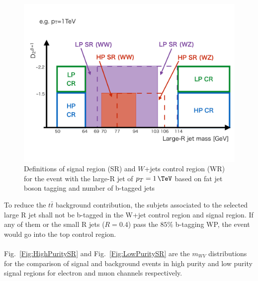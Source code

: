\begin{figure}[h]
	\centering
	\includegraphics[width=0.8\hsize]{Chapter3/HPLPdefinitions}
	\caption{Definitions of signal region (SR) and $W$+jets control region (WR) for the event with the large-R jet of $\pt=1\,\TeV$ based on fat jet boson tagging and number of b-tagged jets }
	\label{Fig:HPLPdefinitions}
\end{figure}
\noindent
To reduce the $t\bar{t}$ background contribution, the subjets associated to the selected large R jet shall not be b-tagged in the W+jet control region and signal region. If any of them or the small R jets ($R=0.4$) pass the $85\%$ b-tagging WP, the event would go into the top control region. 
\\
\\Fig.~\ref{Fig:HighPuritySR} and Fig.~\ref{Fig:LowPuritySR} are the $m_{WV}$ distributions for the comparison of signal and background events in high purity and low purity signal regions for electron and muon channels respectively. 
